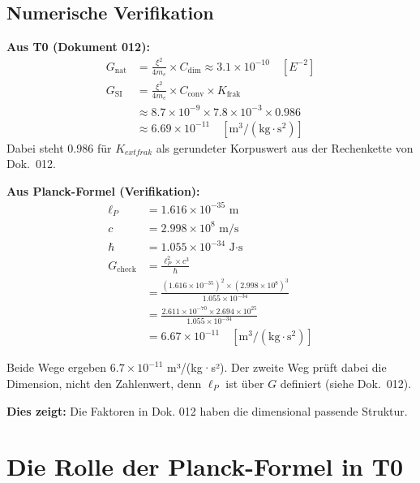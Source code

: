 	\subsection{Numerische Verifikation}
	
	\begin{verification}
		\textbf{Aus T0 (Dokument 012):}
		\begin{align}
			G_{\text{nat}} &= \frac{\xi^2}{4m_e} \times C_{\text{dim}} \approx 3.1 \times 10^{-10} \quad [E^{-2}] \\
			G_{\text{SI}} &= \frac{\xi^2}{4m_e} \times C_{\text{conv}} \times K_{\text{frak}} \\
			&\approx 8.7 \times 10^{-9} \times 7.8 \times 10^{-3} \times 0.986 \\
			&\approx 6.69 \times 10^{-11} \quad [\text{m}^3/(\text{kg} \cdot \text{s}^2)]
		\end{align}
		Dabei steht $0.986$ für $K_{	ext{frak}}$ als gerundeter Korpuswert aus der Rechenkette von Dok.~012.
		
		
		\textbf{Aus Planck-Formel (Verifikation):}
		\begin{align}
			\ell_P &= 1.616 \times 10^{-35} \text{ m} \\
			c &= 2.998 \times 10^8 \text{ m/s} \\
			\hbar &= 1.055 \times 10^{-34} \text{ J·s} \\
			G_{\text{check}} &= \frac{\ell_P^2 \times c^3}{\hbar} \\
			&= \frac{(1.616 \times 10^{-35})^2 \times (2.998 \times 10^8)^3}{1.055 \times 10^{-34}} \\
			&= \frac{2.611 \times 10^{-70} \times 2.694 \times 10^{25}}{1.055 \times 10^{-34}} \\
			&= 6.67 \times 10^{-11} \quad [\text{m}^3/(\text{kg} \cdot \text{s}^2)]
		\end{align}
		
		Beide Wege ergeben $6.7 \times 10^{-11}$ m³/(kg·s²). Der zweite Weg prüft dabei die Dimension, nicht den Zahlenwert, denn $\ell_P$ ist über $G$ definiert (siehe Dok.~012).
		
		\textbf{Dies zeigt:} Die Faktoren in Dok. 012 haben die dimensional passende Struktur.
	\end{verification}
	
	\section{Die Rolle der Planck-Formel in T0}
	
